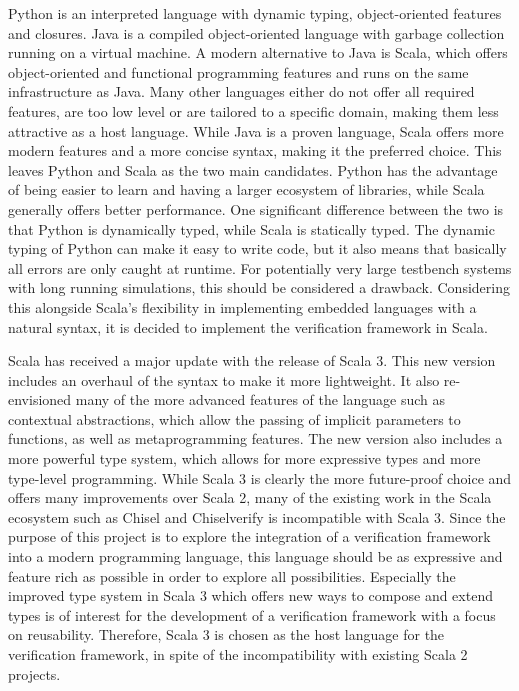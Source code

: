 \documentclass[11pt,a4paper]{report}
\begin{document}
Python is an interpreted language with dynamic typing, object-oriented features and closures. Java is a compiled
object-oriented language with garbage collection running on a virtual machine. A modern alternative to Java is Scala,
which offers object-oriented and functional programming features and runs on the same infrastructure as Java. Many
other languages either do not offer all required features, are too low level or are tailored to a specific domain,
making them less attractive as a host language. While Java is a proven language, Scala offers more modern features
and a more concise syntax, making it the preferred choice. This leaves Python and Scala as the two main candidates.
Python has the advantage of being easier to learn and having a larger ecosystem of libraries, while Scala generally
offers better performance. One significant difference between the two is that Python is dynamically typed, while
Scala is statically typed. The dynamic typing of Python can make it easy to write code, but it also means that
basically all errors are only caught at runtime. For potentially very large testbench systems with long running
simulations, this should be considered a drawback. Considering this alongside Scala's flexibility in implementing
embedded languages with a natural syntax, it is decided to implement the verification framework in Scala.

Scala has received a major update with the release of Scala 3. This new version includes an overhaul of the syntax to make it more lightweight. It also re-envisioned many of the more advanced features of the language such as contextual abstractions, which allow the passing of implicit parameters to functions, as well as metaprogramming features. The new version also includes a more powerful type system, which allows for more expressive types and more type-level programming. While Scala 3 is clearly the more future-proof choice and offers many improvements over Scala 2, many of the existing work in the Scala ecosystem such as Chisel and Chiselverify is incompatible with Scala 3. Since the purpose of this project is to explore the integration of a verification framework into a modern programming language, this language should be as expressive and feature rich as possible in order to explore all possibilities. Especially the improved type system in Scala 3 which offers new ways to compose and extend types is of interest for the development of a verification framework with a focus on reusability. Therefore, Scala 3 is chosen as the host language for the verification framework, in spite of the incompatibility with existing Scala 2 projects.
\end{document}
